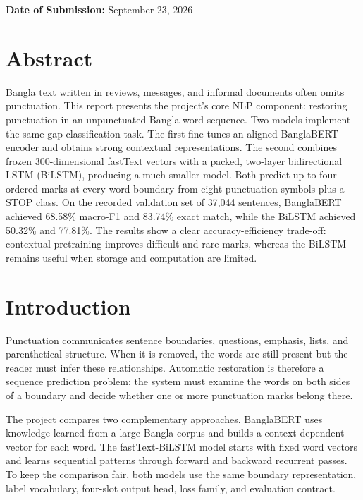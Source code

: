 \documentclass[11pt,a4paper]{article}
\begin{document}
\begin{titlepage}
\begin{center}
\vfill
{\large\textbf{Date of Submission:} September 23, 2026\par}
\vspace{8mm}
\end{center}
\end{titlepage}

\setcounter{page}{1}

\section{Abstract}
Bangla text written in reviews, messages, and informal documents often omits punctuation. This report presents the project's core NLP component: restoring punctuation in an unpunctuated Bangla word sequence. Two models implement the same gap-classification task. The first fine-tunes an aligned BanglaBERT encoder and obtains strong contextual representations. The second combines frozen 300-dimensional fastText vectors with a packed, two-layer bidirectional LSTM (BiLSTM), producing a much smaller model. Both predict up to four ordered marks at every word boundary from eight punctuation symbols plus a STOP class. On the recorded validation set of 37,044 sentences, BanglaBERT achieved 68.58\% macro-F1 and 83.74\% exact match, while the BiLSTM achieved 50.32\% and 77.81\%. The results show a clear accuracy-efficiency trade-off: contextual pretraining improves difficult and rare marks, whereas the BiLSTM remains useful when storage and computation are limited.

\section{Introduction}
Punctuation communicates sentence boundaries, questions, emphasis, lists, and parenthetical structure. When it is removed, the words are still present but the reader must infer these relationships. Automatic restoration is therefore a sequence prediction problem: the system must examine the words on both sides of a boundary and decide whether one or more punctuation marks belong there.

The project compares two complementary approaches. BanglaBERT uses knowledge learned from a large Bangla corpus and builds a context-dependent vector for each word. The fastText-BiLSTM model starts with fixed word vectors and learns sequential patterns through forward and backward recurrent passes. To keep the comparison fair, both models use the same boundary representation, label vocabulary, four-slot output head, loss family, and evaluation contract.
\end{document}
